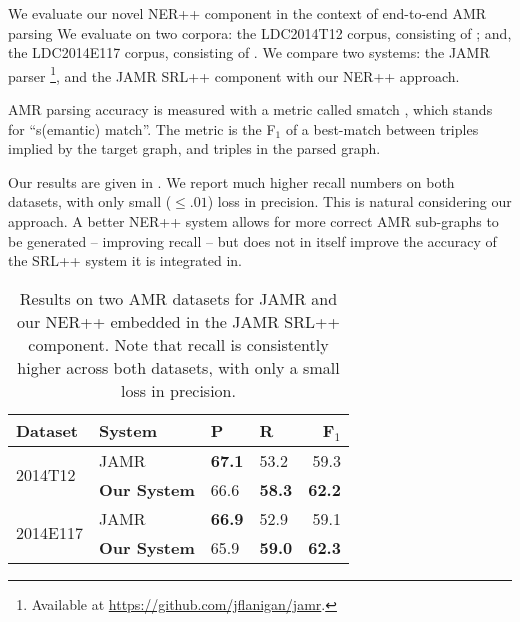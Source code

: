 \documentclass[11pt]{article}
\begin{document}
We evaluate our novel NER++ component in the context of end-to-end AMR parsing
We evaluate on two corpora: the LDC2014T12 corpus, consisting of ;
  and, the LDC2014E117 corpus, consisting of .
We compare two systems: the JAMR parser \cite{2014flanigan-amr}
  \footnote{Available at \url{https://github.com/jflanigan/jamr}.},
  and the JAMR SRL++ component with our NER++ approach.

AMR parsing accuracy is measured with a metric called smatch \needcite, which stands 
  for ``s(emantic) match''. 
The metric is the F$_1$ of a best-match between triples implied by the target graph, 
  and triples in the parsed graph. 

Our results are given in .
We report much higher recall numbers on both datasets, with only small ($\leq .01$) 
  loss in precision.
This is natural considering our approach.
A better NER++ system allows for more correct AMR sub-graphs to be generated --
  improving recall -- but does not in itself improve the accuracy of the
  SRL++ system it is integrated in.


\begin{table}[t]
\begin{center}
\begin{tabular}{l|l|llr}
\textbf{Dataset} &  \textbf{System} & \textbf{P} & \textbf{R} & \textbf{F$_1$} \\
\hline
\multirow{2}{*}{2014T12} & JAMR & \textbf{67.1} & 53.2 & 59.3 \\
  & \textbf{Our System} & 66.6 & \textbf{58.3} & \textbf{62.2} \\
\hline
\multirow{2}{*}{2014E117} & JAMR & \textbf{66.9} & 52.9 & 59.1 \\
  & \textbf{Our System} & 65.9 & \textbf{59.0} & \textbf{62.3} \\
\end{tabular}
\end{center}
\caption{\label{tab:results} 
Results on two AMR datasets for JAMR and our NER++ embedded in the JAMR SRL++
  component.
Note that recall is consistently higher across both datasets, with only a small
  loss in precision.
}
\end{table}
\end{document}
